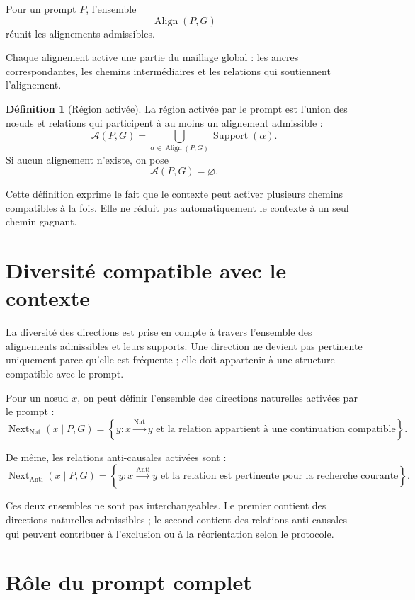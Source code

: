 \documentclass[11pt,a4paper]{report}
\theoremstyle{definition}
\newtheorem{definition}{Définition}[chapter]
\theoremstyle{plain}
\theoremstyle{remark}
\newcommand{\A}{\mathcal{A}}
\newcommand{\Align}{\operatorname{Align}}
\newcommand{\Next}{\operatorname{Next}}
\begin{document}
Pour un prompt \(P\), l'ensemble
\[
\Align(P,G)
\]
réunit les alignements admissibles.

Chaque alignement active une partie du maillage global :
les ancres correspondantes, les chemins intermédiaires et les
relations qui soutiennent l'alignement.

\begin{definition}[Région activée]
La région activée par le prompt est l'union des nœuds et relations
qui participent à au moins un alignement admissible :
\[
\A(P,G)=
\bigcup_{\alpha\in\Align(P,G)}
\operatorname{Support}(\alpha).
\]
Si aucun alignement n'existe, on pose
\[
\A(P,G)=\varnothing.
\]
\end{definition}

Cette définition exprime le fait que le contexte peut activer
plusieurs chemins compatibles à la fois. Elle ne réduit pas
automatiquement le contexte à un seul chemin gagnant.

\section{Diversité compatible avec le contexte}

La diversité des directions est prise en compte à travers
l'ensemble des alignements admissibles et leurs supports.
Une direction ne devient pas pertinente uniquement parce
qu'elle est fréquente ; elle doit appartenir à une structure
compatible avec le prompt.

Pour un nœud \(x\), on peut définir l'ensemble des directions
naturelles activées par le prompt :
\[
\Next_{\mathrm{Nat}}(x\mid P,G)=
\left\{
y:
x\overset{\mathrm{Nat}}{\longrightarrow}y
\text{ et la relation appartient à une continuation compatible}
\right\}.
\]

De même, les relations anti-causales activées sont :
\[
\Next_{\mathrm{Anti}}(x\mid P,G)=
\left\{
y:
x\overset{\mathrm{Anti}}{\longrightarrow}y
\text{ et la relation est pertinente pour la recherche courante}
\right\}.
\]

Ces deux ensembles ne sont pas interchangeables. Le premier
contient des directions naturelles admissibles ; le second
contient des relations anti-causales qui peuvent contribuer
à l'exclusion ou à la réorientation selon le protocole.

\section{Rôle du prompt complet}
\end{document}
